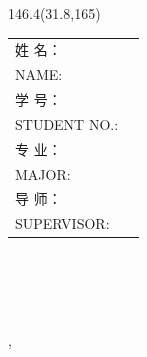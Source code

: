 \begin{titlepage}
	\begin{textblock}{146.4}(31.8,165)
		\begin{center}
			\renewcommand{\arraystretch}{0.9}
			\bfseries{}\rmfamily
			\begin{tabular}{ l r }
				姓\hspace{23pt} 名：            & \makebox[9cm][l]{\Author}        \\
				NAME:                          & \underline{{\makebox[9cm][l]{\AuthorENG}}}        \\
				学\hspace{23pt} 号：            & \makebox[9cm][l]{\StudentID}     \\
				STUDENT NO.:                   &  \underline{{\makebox[9cm][l]{\StudentID}}}     \\			
				专\hspace{23pt} 业：            & \makebox[9cm][l]{\Major}        \\
				MAJOR:                         & \underline{{\makebox[9cm][l]{\MajorENG}}} \\
				导\hspace{23pt} 师：            & \makebox[9cm][l]{\Supervisor\quad \AcademicTitle }    \\
				SUPERVISOR:                     &  \underline{{\makebox[9cm][l]{\AcademicTitleENG\, \SupervisorENG}}}    \\		
			\end{tabular}\\
			\vspace{1em}
			\location \\
			\nointerlineskip
			\vspace{10pt}
			\locationENG \\
			\nointerlineskip
			\vspace{15pt}
			\CompleteYear\hspace*{1em}\textbf{}\hspace*{1em}\CompleteMonth\hspace*{1em}\textbf{} \\
			\nointerlineskip
			\vspace{10pt}
			\CompleteMonthENG,\, \CompleteYearENG
		\end{center}
	\end{textblock}
	
\end{titlepage}